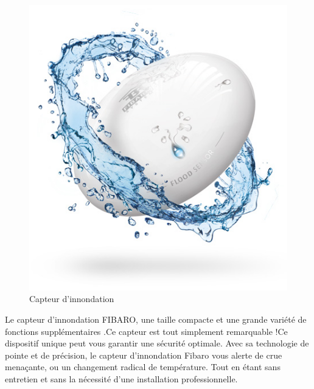 \begin{description}
\begin{figure}[h!]
	\center
	\includegraphics[scale=0.5]{./Images/jpg/floodSensor_FibaroDevice.jpg}
	\caption{Capteur d'innondation}
\end{figure}

Le capteur d'innondation FIBARO, une taille compacte et une grande variété de fonctions supplémentaires .Ce capteur est tout simplement remarquable !Ce dispositif unique peut vous garantir une sécurité optimale. Avec sa technologie de pointe et de précision, le capteur d'innondation Fibaro vous alerte de crue menaçante, ou un changement radical de température. Tout en étant sans entretien et sans la nécessité d'une installation professionnelle.




\end{description}
